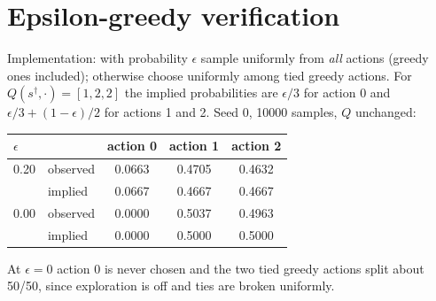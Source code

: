 \documentclass[11pt]{article}
\newcommand{\epsseed}{0}
\newcommand{\epsn}{10000}
\begin{document}
\section{Epsilon-greedy verification}
Implementation: with probability $\epsilon$ sample uniformly from \emph{all} actions (greedy ones included); otherwise choose uniformly among tied greedy actions. For $Q(s^\dagger,\cdot)=[1,2,2]$ the implied probabilities are $\epsilon/3$ for action 0 and $\epsilon/3+(1-\epsilon)/2$ for actions 1 and 2. Seed \epsseed, \epsn{} samples, $Q$ unchanged:
\begin{center}\begin{tabular}{llccc}
\toprule
$\epsilon$ &  & action 0 & action 1 & action 2 \\
\midrule
0.20 & observed & 0.0663 & 0.4705 & 0.4632 \\
 & implied & 0.0667 & 0.4667 & 0.4667 \\
0.00 & observed & 0.0000 & 0.5037 & 0.4963 \\
 & implied & 0.0000 & 0.5000 & 0.5000 \\
\bottomrule
\end{tabular}\end{center}
At $\epsilon=0$ action 0 is never chosen and the two tied greedy actions split about 50/50, since exploration is off and ties are broken uniformly.
\end{document}
